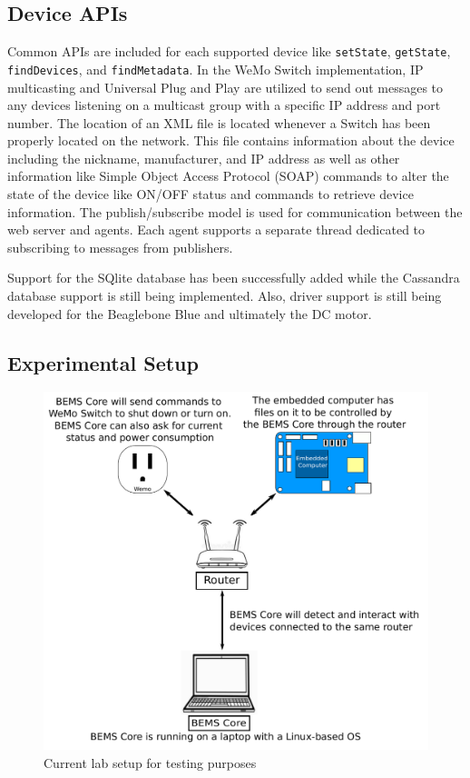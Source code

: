 \documentclass[letterpaper,12pt]{article}   %
\begin{document}
\subsection{Device APIs}
Common APIs are included for each supported device like \texttt{setState}, \texttt{getState}, \texttt{findDevices}, and \texttt{findMetadata}. In the WeMo Switch implementation, IP multicasting and Universal Plug and Play are utilized to send out messages to any devices listening on a multicast group with a specific IP address and port number. The location of an XML file is located whenever a Switch has been properly located on the network. This file contains information about the device including the nickname, manufacturer, and IP address as well as other information like Simple Object Access Protocol (SOAP) commands to alter the state of the device like ON/OFF status and commands to retrieve device information. The publish/subscribe model is used for communication between the web server and agents. Each agent supports a separate thread dedicated to subscribing to messages from publishers.

Support for the SQlite database has been successfully added while the Cassandra database support is still being implemented. Also, driver support is still being developed for the Beaglebone Blue and ultimately the DC motor.

\subsection{Experimental Setup} \label{sec:expsetup}
\begin{figure}[H]
    \centering
    \includegraphics[scale=0.8]{figs/experimentalSetup.pdf}
    \caption{Current lab setup for testing purposes}
    \label{fig:expLabSetup}
\end{figure}
\end{document}
